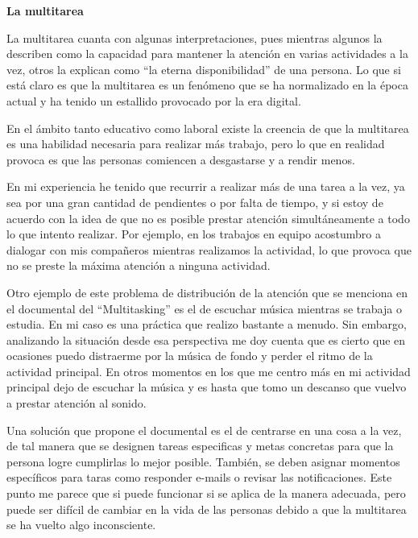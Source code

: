 \documentclass[12pt, titlepage]{article}
\begin{document}
    \begin{center}
        \textbf{La multitarea}
    \end{center}
    
    \noindent La multitarea cuanta con algunas interpretaciones, pues mientras algunos la describen como la capacidad para mantener la atención en varias actividades a la vez, otros la explican como ``la eterna disponibilidad'' de una persona. Lo que si está claro es que la multitarea es un fenómeno que se ha normalizado en la época actual y ha tenido un estallido provocado por la era digital.

    En el ámbito tanto educativo como laboral existe la creencia de que la multitarea es una habilidad necesaria para realizar más trabajo, pero lo que en realidad provoca es que las personas comiencen a desgastarse y a rendir menos. 
    
    En mi experiencia he tenido que recurrir a realizar más de una tarea a la vez, ya sea por una gran cantidad de pendientes o por falta de tiempo, y si estoy de acuerdo con la idea de que no es posible prestar atención simultáneamente a todo lo que intento realizar. Por ejemplo, en los trabajos en equipo acostumbro a dialogar con mis compañeros mientras realizamos la actividad, lo que provoca que no se preste la máxima atención a ninguna actividad. 
    
    Otro ejemplo de este problema de distribución de la atención que se menciona en el documental del ``Multitasking'' es el de escuchar música mientras se trabaja o estudia. En mi caso es una práctica que realizo bastante a menudo. Sin embargo, analizando la situación desde esa perspectiva me doy cuenta que es cierto que en ocasiones puedo distraerme por la música de fondo y perder el ritmo de la actividad principal. En otros momentos en los que me centro más en mi actividad principal dejo de escuchar la música y es hasta que tomo un descanso que vuelvo a prestar atención al sonido. 

    Una solución que propone el documental es el de centrarse en una cosa a la vez, de tal manera que se designen tareas especificas y metas concretas para que la persona logre cumplirlas lo mejor posible. También, se deben asignar momentos específicos para taras como responder e-mails o revisar las notificaciones. Este punto me parece que si puede funcionar si se aplica de la manera adecuada, pero puede ser difícil de cambiar en la vida de las personas debido a que la multitarea se ha vuelto algo inconsciente.
    
\end{document}
